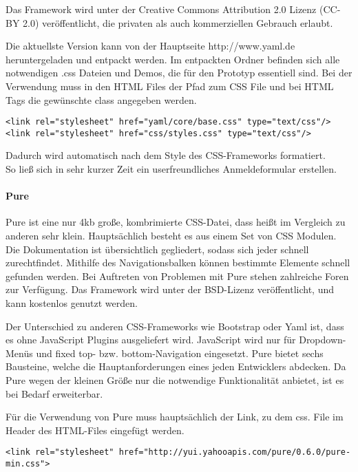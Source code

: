 Das Framework wird unter der Creative Commons Attribution 2.0 Lizenz (CC-BY 2.0) veröffentlicht, die privaten als auch kommerziellen Gebrauch erlaubt.

Die aktuellste Version kann von der Hauptseite http://www.yaml.de heruntergeladen und entpackt werden. Im entpackten Ordner befinden sich alle notwendigen .css Dateien und Demos, die für den Prototyp essentiell sind. Bei der Verwendung muss in den HTML Files der Pfad zum CSS File und bei HTML Tags die gewünschte class angegeben werden. 
\begin{lstlisting}[caption={YAML einbinden \cite{YAMLPROTO}}]
<link rel="stylesheet" href="yaml/core/base.css" type="text/css"/>
<link rel="stylesheet" href="css/styles.css" type="text/css"/>
\end{lstlisting}

Dadurch wird automatisch nach dem Style des CSS-Frameworks formatiert.\\
So ließ sich in sehr kurzer Zeit ein userfreundliches Anmeldeformular erstellen.

\paragraph{Pure}
Pure ist eine nur 4kb große, kombrimierte CSS-Datei, dass heißt im Vergleich zu anderen sehr klein. Hauptsächlich besteht es aus einem Set von CSS Modulen. Die Dokumentation ist übersichtlich gegliedert, sodass sich jeder schnell zurechtfindet. Mithilfe des Navigationsbalken können bestimmte Elemente schnell gefunden werden. Bei Auftreten von Problemen mit Pure stehen zahlreiche Foren zur Verfügung. Das Framework wird unter der BSD-Lizenz veröffentlicht, und kann kostenlos genutzt werden.

Der Unterschied zu anderen CSS-Frameworks wie Bootstrap oder Yaml ist, dass es ohne JavaScript Plugins ausgeliefert wird. JavaScript wird nur für Dropdown-Menüs und fixed top- bzw. bottom-Navigation eingesetzt. Pure bietet sechs Bausteine, welche die Hauptanforderungen eines jeden Entwicklers abdecken. Da Pure wegen der kleinen Größe nur die notwendige Funktionalität anbietet, ist es bei Bedarf erweiterbar.

Für die Verwendung von Pure muss hauptsächlich der Link, zu dem css. File im Header des HTML-Files eingefügt werden. \cite{PURE}
\begin{lstlisting}[caption={Pure einbinden \cite{PURE}}]
<link rel="stylesheet" href="http://yui.yahooapis.com/pure/0.6.0/pure-min.css">
\end{lstlisting}

